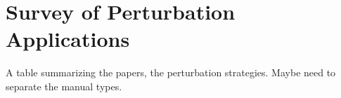 \section{Survey of Perturbation Applications}

A table summarizing the papers, the perturbation strategies.
Maybe need to separate the manual types.

\begin{comment}
	\begin{table}
\small
\centering
\setlength{\tabcolsep}{3.5pt}

\begin{tabular}{c c c c c}
\toprule
Application & \textbf{$y'\not\eq y$} & $f(x) \not\eq f(x')$? & Strategies & Properties \\ 
\midrule
Augmentation & \cmark & \qmark & Paraphrasing & Natural; Diverse \\
\bottomrule
\end{tabular}

\caption{The datasets used for finetuning the GPT-2 perturbation model, and the \tagstr distributions.}
\label{table:gpt_train_stats}
\end{table}
\end{comment}

